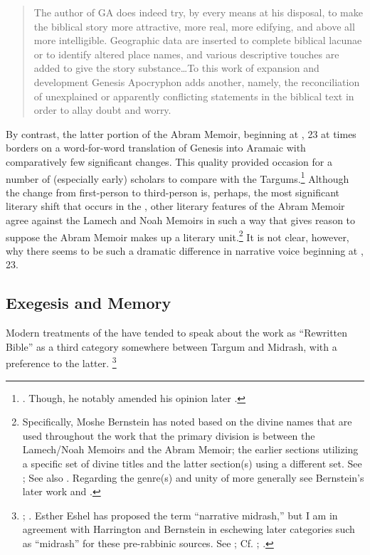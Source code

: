 \begin{quote}
The author of GA does indeed try, by every means at his disposal, to make the biblical story more attractive, more real, more edifying, and above all more intelligible. Geographic data are inserted to complete biblical lacunae or to identify altered  place names, and various descriptive touches are added to give the story substance\dots To this work of expansion and development Genesis Apocryphon adds another, namely, the reconciliation of unexplained or apparently conflicting statements in the biblical text in order to allay doubt and worry.\autocite[125]{vermes1961}
\end{quote}

By contrast, the latter portion of the Abram Memoir, beginning at , 23 at times borders on a word-for-word translation of Genesis into Aramaic with comparatively few significant changes. This quality provided occasion for a number of (especially early) scholars to compare \ga with the Targums.\footnote{\cite[193]{black1983}. Though, he notably amended his opinion later \cite*{black_black-fohrer1968}.} Although the change from first-person to third-person is, perhaps, the most significant literary shift that occurs in the \ga, other literary features of the Abram Memoir agree against the Lamech and Noah Memoirs in such a way that gives reason to suppose the Abram Memoir makes up a literary unit.\footnote{Specifically, Moshe Bernstein has noted based on the divine names that are used throughout the work that the primary division is between the Lamech/Noah Memoirs and the Abram Memoir; the earlier sections utilizing a specific set of divine titles and the latter section(s) using a different set. See \cite{bernstein_jbl2009}; See also \cite[97]{falk2007}. Regarding the genre(s) and unity of \ga more generally see Bernstein's later work \cite*{bernstein_berthelot-etal2010} and \cite*{bernstein_as2010}.} It is not clear, however, why there seems to be such a dramatic difference in narrative voice beginning at , 23.

\subsection{Exegesis and Memory}

Modern treatments of the \ga have tended to speak about the work as ``Rewritten Bible'' as a third category somewhere between Targum and Midrash, with a preference to the latter.%
%
\footnote{\cite{evans_revq1988}; \cite[19]{fitzmyer2004}. Esther Eshel has proposed the term ``narrative midrash,'' but I am in agreement with Harrington and Bernstein in eschewing later categories such as ``midrash'' for these pre-rabbinic sources. See \cite[182]{eshel_roitman-etal2011}; Cf. \cite[242]{harrington_kraft-nickelsburg1986}; \cite[327 n. 33; 328--329]{bernstein_berthelot-etal2010}.}

